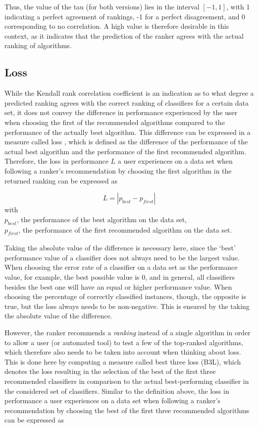Thus, the value of the tau (for both versions) lies in the interval $[-1,1]$, with 1 indicating a perfect agreement of rankings, -1 for a perfect disagreement, and 0 corresponding to no correlation. A high value is therefore desirable in this context, as it indicates that the prediction of the ranker agrees with the actual ranking of algorithms.

\subsection{Loss}
While the Kendall rank correlation coefficient is an indication as to what degree a predicted ranking agrees with the correct ranking of classifiers for a certain data set, it does not convey the difference in performance experienced by the user when choosing the first of the recommended algorithms compared to the performance of the actually best algorithm. This difference can be expressed in a measure called loss \cite{DBLP:conf/mldm/LeiteBV12}, which is defined as the difference of the performance of the actual best algorithm and the performance of the first recommended algorithm. Therefore, the loss in performance $L$ a user experiences on a data set when following a ranker's recommendation by choosing the first algorithm in the returned ranking can be expressed as 

$$L=|p_{\textit{best}}-p_{\textit{first}}|$$
with \\
$p_{\textit{best}}$, the performance of the best algorithm on the data set, \\
$p_{\textit{first}}$, the  performance of the first recommended algorithm on the data set.

Taking the absolute value of the difference is necessary here, since the `best' performance value of a classifier does not always need to be the largest value. When choosing the error rate of a classifier on a data set as the performance value, for example, the best possible value is 0, and in general, all classifiers besides the best one will have an equal or higher performance value. When choosing the percentage of correctly classified instances, though, the opposite is true, but the loss always needs to be non-negative. This is ensured by the taking the absolute value of the difference.

However, the ranker recommends a \textit{ranking} instead of a single algorithm in order to allow a user (or automated tool) to test a few of the top-ranked algorithms, which therefore also needs to be taken into account when thinking about loss. This is done here by computing a measure called best three loss (B3L), which denotes the loss resulting in the selection of the best of the first three recommended classifiers in comparison to the actual best-performing classifier in the considered set of classifiers. Similar to the definition above, the loss in performance a user experiences on a data set when following a ranker's recommendation by choosing the best of the first three recommended algorithms can be expressed as

